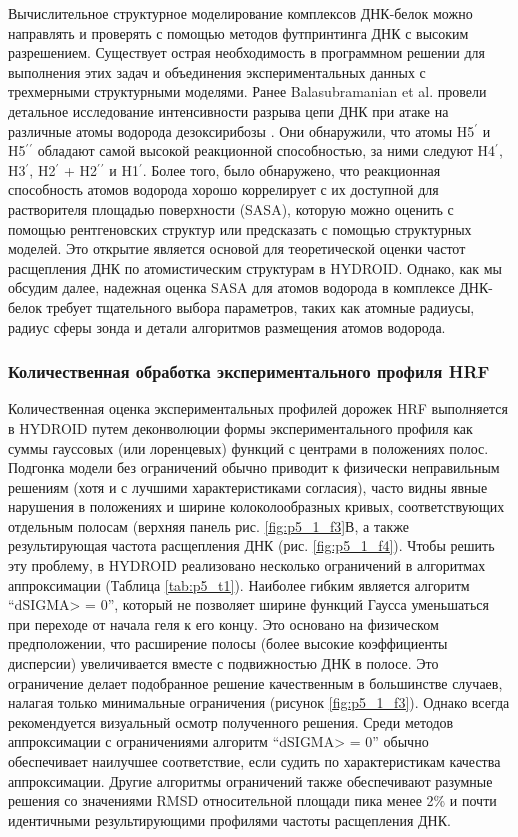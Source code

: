     Вычислительное структурное моделирование комплексов ДНК-белок можно направлять и проверять с помощью методов футпринтинга ДНК с высоким разрешением. Существует острая необходимость в программном решении для выполнения этих задач и объединения экспериментальных данных с трехмерными структурными моделями. Ранее Balasubramanian et al. провели детальное исследование интенсивности разрыва цепи ДНК при атаке на различные атомы водорода дезоксирибозы \cite{balasubramanian_dna_1998}. Они обнаружили, что атомы H5$^\prime$ и H5$^\prime$$^\prime$ обладают самой высокой реакционной способностью, за ними следуют H4$^\prime$, H3$^\prime$, H2$^\prime$ + H2$^\prime$$^\prime$ и H1$^\prime$. Более того, было обнаружено, что реакционная способность атомов водорода хорошо коррелирует с их доступной для растворителя площадью поверхности (SASA), которую можно оценить с помощью рентгеновских структур или предсказать с помощью структурных моделей. Это открытие является основой для теоретической оценки частот расщепления ДНК по атомистическим структурам в HYDROID. Однако, как мы обсудим далее, надежная оценка SASA для атомов водорода в комплексе ДНК-белок требует тщательного выбора параметров, таких как атомные радиусы, радиус сферы зонда и детали алгоритмов размещения атомов водорода.
    
    \subsubsection{Количественная обработка экспериментального профиля HRF}
    Количественная оценка экспериментальных профилей дорожек HRF выполняется в HYDROID путем деконволюции формы экспериментального профиля как суммы гауссовых (или лоренцевых) функций с центрами в положениях полос. Подгонка модели без ограничений обычно приводит к физически неправильным решениям (хотя и с лучшими характеристиками согласия), часто видны явные нарушения в положениях и ширине колоколообразных кривых, соответствующих отдельным полосам (верхняя панель рис. \ref{fig:p5_1_f3}В, а также результирующая частота расщепления ДНК (рис. \ref{fig:p5_1_f4}). Чтобы решить эту проблему, в HYDROID реализовано несколько ограничений в алгоритмах аппроксимации (Таблица \ref{tab:p5_t1}). Наиболее гибким является алгоритм ``dSIGMA> = 0'', который не позволяет ширине функций Гаусса уменьшаться при переходе от начала геля к его концу. Это основано на физическом предположении, что расширение полосы (более высокие коэффициенты дисперсии) увеличивается вместе с подвижностью ДНК в полосе. Это ограничение делает подобранное решение качественным в большинстве случаев, налагая только минимальные ограничения (рисунок \ref{fig:p5_1_f3}). Однако всегда рекомендуется визуальный осмотр полученного решения. Среди методов аппроксимации с ограничениями алгоритм ``dSIGMA> = 0'' обычно обеспечивает наилучшее соответствие, если судить по характеристикам качества аппроксимации. Другие алгоритмы ограничений также обеспечивают разумные решения со значениями RMSD относительной площади пика менее 2\% и почти идентичными результирующими профилями частоты расщепления ДНК.
    
